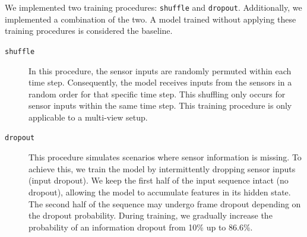 We implemented two training procedures: \texttt{shuffle} and \texttt{dropout}. Additionally, we implemented a combination of the two. A model trained without applying these training procedures is considered the baseline.

\begin{description}
    \item[\texttt{shuffle}] In this procedure, the sensor inputs are randomly permuted within each time step. Consequently, the model receives inputs from the sensors in a random order for that specific time step. This shuffling only occurs for sensor inputs within the same time step. This training procedure is only applicable to a multi-view setup.

    \item[\texttt{dropout}] This procedure simulates scenarios where sensor information is missing. To achieve this, we train the model by intermittently dropping sensor inputs (input dropout). We keep the first half of the input sequence intact (no dropout), allowing the model to accumulate features in its hidden state. The second half of the sequence may undergo frame dropout depending on the dropout probability. During training, we gradually increase the probability of an information dropout from 10\% up to 86.6\%.
\end{description}





